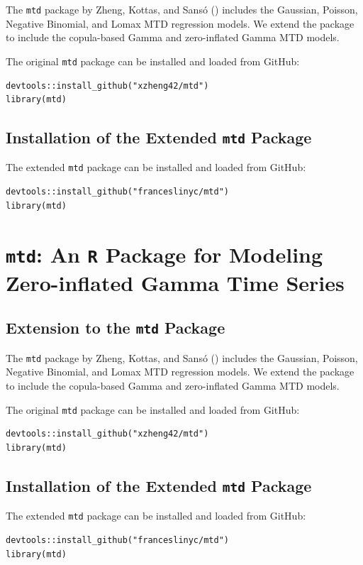 \documentclass[
  letterpaper,
  double,
  12pt,
  1.0in]{beavtex}
\begin{document}
The \texttt{mtd} package by Zheng, Kottas, and Sansó
() includes the Gaussian,
Poisson, Negative Binomial, and Lomax MTD regression models. We extend
the package to include the copula-based Gamma and zero-inflated Gamma
MTD models.

The original \texttt{mtd} package can be installed and loaded from
GitHub:

\begin{verbatim}
devtools::install_github("xzheng42/mtd")
library(mtd)
\end{verbatim}

\section{\texorpdfstring{Installation of the Extended \texttt{mtd}
Package}{Installation of the Extended mtd Package}}\label{installation-of-the-extended-mtd-package}

The extended \texttt{mtd} package can be installed and loaded from
GitHub:

\begin{verbatim}
devtools::install_github("franceslinyc/mtd")
library(mtd)
\end{verbatim}

\chapter{\texorpdfstring{\texttt{mtd}: An \texttt{R} Package for
Modeling Zero-inflated Gamma Time
Series}{mtd: An R Package for Modeling Zero-inflated Gamma Time Series}}\label{sec-appendix-ch2-pkag}

\section{\texorpdfstring{Extension to the \texttt{mtd}
Package}{Extension to the mtd Package}}\label{extension-to-the-mtd-package-1}

The \texttt{mtd} package by Zheng, Kottas, and Sansó
() includes the Gaussian,
Poisson, Negative Binomial, and Lomax MTD regression models. We extend
the package to include the copula-based Gamma and zero-inflated Gamma
MTD models.

The original \texttt{mtd} package can be installed and loaded from
GitHub:

\begin{verbatim}
devtools::install_github("xzheng42/mtd")
library(mtd)
\end{verbatim}

\section{\texorpdfstring{Installation of the Extended \texttt{mtd}
Package}{Installation of the Extended mtd Package}}\label{installation-of-the-extended-mtd-package-1}

The extended \texttt{mtd} package can be installed and loaded from
GitHub:

\begin{verbatim}
devtools::install_github("franceslinyc/mtd")
library(mtd)
\end{verbatim}
\end{document}
